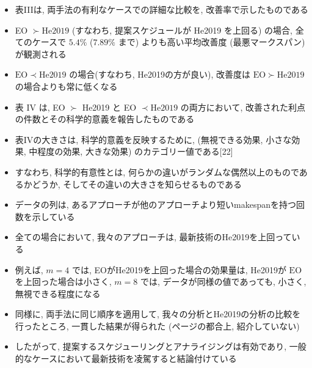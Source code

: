 \begin{frame}{}
    \begin{itemize}
        \item 表IIIは, 両手法の有利なケースでの詳細な比較を, 改善率で示したものである
\item EO $\succ \mathrm{He} 2019$ (すなわち, 提案スケジュールが He2019 を上回る) の場合, 全てのケースで $5.4 \%$ ($7.89 \%$ まで) よりも高い平均改善度 (最悪マークスパン) が観測される
\item $\mathrm{EO} \prec \mathrm{He} 2019$ の場合(すなわち, He2019の方が良い), 改善度は $\mathrm{EO} \succ \mathrm{He} 2019$ の場合よりも常に低くなる
    \end{itemize}
\end{frame}

\begin{frame}{}
    \begin{itemize}
        \item 表 IV は, EO $\succ$ He2019 と EO $\prec \mathrm{He} 2019$ の両方において, 改善された利点の件数とその科学的意義を報告したものである
\item 表IVの大きさは, 科学的意義を反映するために,  (無視できる効果, 小さな効果, 中程度の効果, 大きな効果) のカテゴリー値である[22]
\item すなわち, 科学的有意性とは, 何らかの違いがランダムな偶然以上のものであるかどうか, そしてその違いの大きさを知らせるものである
\item データの列は, あるアプローチが他のアプローチより短いmakespanを持つ回数を示している
\item 全ての場合において, 我々のアプローチは, 最新技術のHe2019を上回っている
\item 例えば, $m=4$ では, EOがHe2019を上回った場合の効果量は, He2019が $\mathrm{EO}$ を上回った場合は小さく, $m=8$ では, データが同様の値であっても, 小さく, 無視できる程度になる
    \end{itemize}
\end{frame}

\begin{frame}{}
    \begin{itemize}
        \item 同様に, 両手法に同じ順序を適用して, 我々の分析とHe2019の分析の比較を行ったところ, 一貫した結果が得られた (ページの都合上, 紹介していない) 
\item したがって, 提案するスケジューリングとアナライジングは有効であり, 一般的なケースにおいて最新技術を凌駕すると結論付けている
    \end{itemize}
\end{frame}


